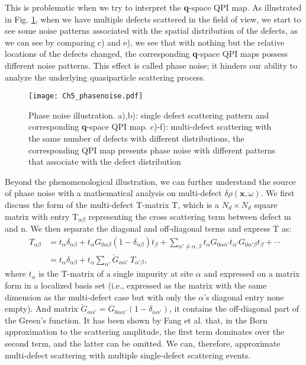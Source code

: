 This is problematic when we try to interpret the \textbf{q}-space \ac{QPI} map. As illustrated in Fig. \ref{fig:ch5_phasenoise}, when we have multiple defects scattered in the field of view, we start to see some noise patterns associated with the spatial distribution of the defects, as we can see by comparing c) and e), we see that with nothing but the relative locations of the defects changed, the corresponding \textbf{q}-space \ac{QPI} maps possess different noise patterns. This effect is called phase noise; it hinders our ability to analyze the underlying quasiparticle scattering process. 

\begin{figure}
	\texttt{[image: Ch5\_phasenoise.pdf]} 
	\centering
	\caption{Phase noise illustration. a),b): single defect scattering pattern and corresponding \textbf{q}-space QPI map. c)-f): multi-defect scattering with the same number of defects with different distributions, the corresponding QPI map presents phase noise with different patterns that associate with the defect distribution}
	\label{fig:ch5_phasenoise}
\end{figure}

Beyond the phenomenological illustration, we can further understand the source of phase noise with a mathematical analysis on multi-defect $\delta\rho(\textbf{x},\omega)$. We first discuss the form of the multi-defect T-matrix T, which is a $N_d \times N_d$ square matrix with entry T$_{\alpha \beta}$ representing the cross scattering term between defect m and n. We then separate the diagonal and off-diagonal terms and express T as\cite{leonard1972}:
\begin{align}
	\ T_{\alpha\beta} &= t_{\alpha} \delta_{\alpha\beta} + t_{\alpha} G_{0\alpha\beta} (1 - \delta_{\alpha\beta}) t_{\beta} + \sum_{\alpha' \neq \alpha, \beta} t_{\alpha} G_{0\alpha\alpha'} t_{\alpha'} G_{0\alpha'\beta} t_{\beta} + \cdots \label{eq_tmul}\\
	\label{eq.536}
	&= t_{\alpha} \delta_{\alpha\beta} + t_{\alpha} \sum_{\alpha'} \check{G}_{\alpha\alpha'} \ T_{\alpha'\beta},
\end{align}
\noindent where $t_{\alpha}$ is the T-matrix of a single impurity at site $\alpha$ and expressed on a matrix form in a localized basis set (i.e., expressed as the matrix with the same dimension as the multi-defect case but with only the $\alpha$'s diagonal entry none empty). And matrix $\check{G}_{\alpha\alpha'} = G_{0\alpha\alpha'}(1-\delta_{\alpha\alpha'})$, it contains the off-diagonal part of the Green's function. It has been shown by Fang et al. \cite{fangTheoryQuasiparticleInterference2013} that, in the Born approximation to the scattering amplitude, the first term dominates over the second term, and the latter can be omitted. We can, therefore, approximate multi-defect scattering with multiple single-defect scattering events. 

